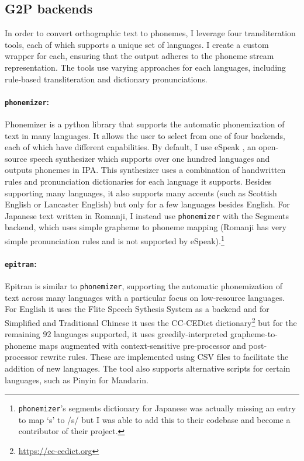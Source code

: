\subsection{G2P backends}
\label{sec:dataset-transliteration-tool-backends}

In order to convert orthographic text to phonemes, I leverage four transliteration tools, each of which supports a unique set of languages. I create a custom wrapper for each, ensuring that the output adheres to the phoneme stream representation. The tools use varying approaches for each languages, including rule-based transliteration and dictionary pronunciations.

\paragraph{\texttt{phonemizer}:}
Phonemizer \citep{Bernard2021} is a python library that supports the automatic phonemization of text in many languages. It allows the user to select from one of four backends, each of which have different capabilities. By default, I use eSpeak \citep{Dunn2019}, an open-source speech synthesizer which supports over one hundred languages and outputs phonemes in IPA. This synthesizer uses a combination of handwritten rules and pronunciation dictionaries for each language it supports. Besides supporting many languages, it also supports many accents (such as Scottish English or Lancaster English) but only for a few languages besides English. For Japanese text written in Romanji, I instead use \texttt{phonemizer} with the Segments \citep{robert_forkel_2019_3549784} backend, which uses simple grapheme to phoneme mapping (Romanji has very simple pronunciation rules and is not supported by eSpeak).\footnote{\texttt{phonemizer}'s segments dictionary for Japanese was actually missing an entry to map `s' to /s/ but I was able to add this to their codebase and become a contributor of their project.}

\paragraph{\texttt{epitran}:}
Epitran \citep{Mortensen-et-al:2018} is similar to \texttt{phonemizer}, supporting the automatic phonemization of text across many languages with a particular focus on low-resource languages. For English it uses the Flite Speech Sythesis System \citep{black2001flite} as a backend and for Simplified and Traditional Chinese it uses the CC-CEDict dictionary\footnote{\url{https://cc-cedict.org}} but for the remaining 92 languages supported, it uses greedily-interpreted grapheme-to-phoneme maps augmented with context-sensitive pre-processor and post-processor rewrite rules. These are implemented using CSV files to facilitate the addition of new languages. The tool also supports alternative scripts for certain languages, such as Pinyin for Mandarin.


